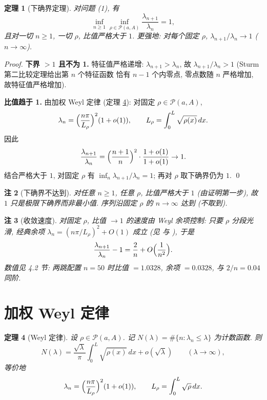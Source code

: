 \documentclass[UTF8]{ctexart}
\newtheorem{theorem}{定理}[section]
\newtheorem{remark}[theorem]{注}
\begin{document}
\begin{theorem}[下确界定理]\label{thm:inf}
	对问题 (1), 有
	\begin{equation}
		\inf_{n \ge 1} \inf_{\rho \in \mathcal P(a,A)} \frac{\lambda_{n+1}}{\lambda_n} = 1,
	\end{equation}
	且对一切 $n \ge 1$, 一切 $\rho$, 比值严格大于 $1$.
	更强地: 对每个固定 $\rho$, $\lambda_{n+1}/\lambda_n \to 1$
	($n \to \infty$).
\end{theorem}

\begin{proof}
	\textbf{下界 $> 1$ 且不为 1.} 特征值严格递增: $\lambda_{n+1} > \lambda_n$,
	故 $\lambda_{n+1}/\lambda_n > 1$ (Sturm 第二比较定理给出第 $n$ 个特征函数
	恰有 $n-1$ 个内零点, 零点数随 $n$ 严格增加, 故特征值严格增加).

	\textbf{比值趋于 1.} 由加权 Weyl 定律 (定理 \ref{thm:weyl}): 对固定
	$\rho \in \mathcal P(a,A)$,
	\[
		\lambda_n = \Bigl(\frac{n\pi}{L_\rho}\Bigr)^2 (1 + o(1)),
		\qquad L_\rho = \int_0^L \sqrt{\rho(x)}\,dx.
	\]
	因此
	\[
		\frac{\lambda_{n+1}}{\lambda_n}
		= \Bigl(\frac{n+1}{n}\Bigr)^2 \cdot \frac{1+o(1)}{1+o(1)} \to 1.
	\]
	结合严格大于 $1$, 对固定 $\rho$ 有 $\inf_n \lambda_{n+1}/\lambda_n = 1$;
	再对 $\rho$ 取下确界仍为 $1$. \qed
\end{proof}

\begin{remark}[下确界不达到]
	对任意 $n \ge 1$, 任意 $\rho$, 比值严格大于 $1$ (由证明第一步),
	故 $1$ 只是极限下确界而非最小值. 序列沿固定 $\rho$ 的 $n \to \infty$
	达到 (不取到).
\end{remark}

\begin{remark}[收敛速度]
	对固定 $\rho$, 比值 $\to 1$ 的速度由 Weyl 余项控制:
	只要 $\rho$ 分段光滑, 经典余项
	$\lambda_n = (n\pi/L_\rho)^2 + O(1)$ 成立 (见 \cite[Ch.~I]{ls} 与
	\cite{am1987}), 于是
	\[
		\frac{\lambda_{n+1}}{\lambda_n} - 1
		= \frac{2}{n} + O\Bigl(\frac{1}{n^2}\Bigr).
	\]
	数值见 4.2 节: 两跳配置 $n = 50$ 时比值 $= 1.0328$, 余项 $= 0.0328$,
	与 $2/n = 0.04$ 同阶.
\end{remark}

\section{加权 Weyl 定律}

\begin{theorem}[Weyl 定律]\label{thm:weyl}
	设 $\rho \in \mathcal P(a,A)$. 记 $N(\lambda) = \#\{n : \lambda_n \le \lambda\}$
	为计数函数. 则
	\begin{equation}
		N(\lambda) = \frac{\sqrt\lambda}{\pi} \int_0^L \sqrt{\rho(x)}\,dx
		+ o(\sqrt\lambda)
		\qquad (\lambda \to \infty),
	\end{equation}
	等价地
	\begin{equation}
		\lambda_n = \Bigl(\frac{n\pi}{L_\rho}\Bigr)^2 (1+o(1)),
		\qquad L_\rho = \int_0^L \sqrt\rho\,dx.
	\end{equation}
\end{theorem}
\end{document}
